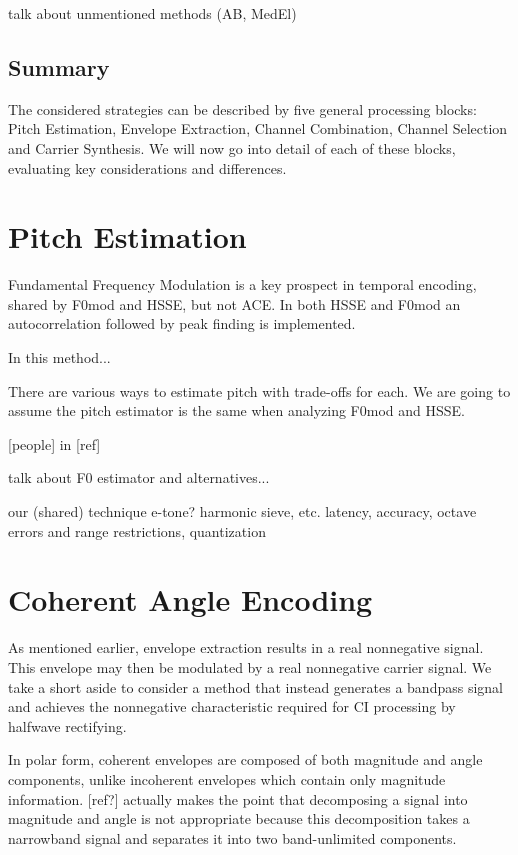 \documentclass [11pt, proquest] {uwthesis}[2015/03/03]
\begin{document}
talk about unmentioned methods (AB, MedEl)

\subsection{Summary}

The considered strategies can be described by five general processing blocks: Pitch Estimation, Envelope Extraction, Channel Combination, Channel Selection and Carrier Synthesis.  We will now go into detail of each of these blocks, evaluating key considerations and differences.

\section{Pitch Estimation}

Fundamental Frequency Modulation is a key prospect in temporal encoding, shared by F0mod and HSSE, but not ACE.  In both HSSE and F0mod an autocorrelation followed by peak finding is implemented.

In this method...

There are various ways to estimate pitch with trade-offs for each.  We are going to assume the pitch estimator is the same when analyzing F0mod and HSSE.


 [people] in [ref] 

talk about F0 estimator and alternatives...

	our (shared) technique
	e-tone? harmonic sieve, etc.
	latency, accuracy, octave errors and range restrictions,
	quantization

\section{Coherent Angle Encoding}

As mentioned earlier, envelope extraction results in a real nonnegative signal.  This envelope may then be modulated by a real nonnegative carrier signal.  We take a short aside to consider a method that instead generates a bandpass signal and achieves the nonnegative characteristic required for CI processing by halfwave rectifying.

In polar form, coherent envelopes are composed of both magnitude and angle components, unlike incoherent envelopes which contain only magnitude information.  [ref?] actually makes the point that decomposing a signal into magnitude and angle is not appropriate because this decomposition takes a narrowband signal and separates it into two band-unlimited components.
\end{document}
